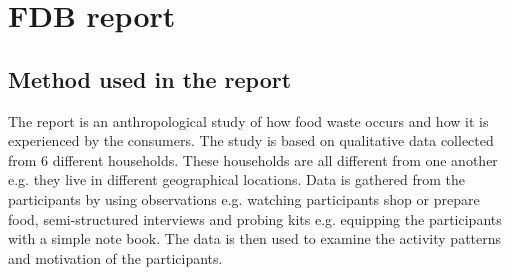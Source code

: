 \section{FDB report}
\subsection{Method used in the report}
The report is an anthropological study of how food waste occurs and how it is experienced by the consumers. The study is based on qualitative data collected from 6 different households. These households are all different from one another e.g. they live in different geographical locations. Data is gathered from the participants by using observations e.g. watching participants shop or prepare food, semi-structured interviews and probing kits e.g. equipping the participants with a simple note book. The data is then used to examine the activity patterns and motivation of the participants. 

